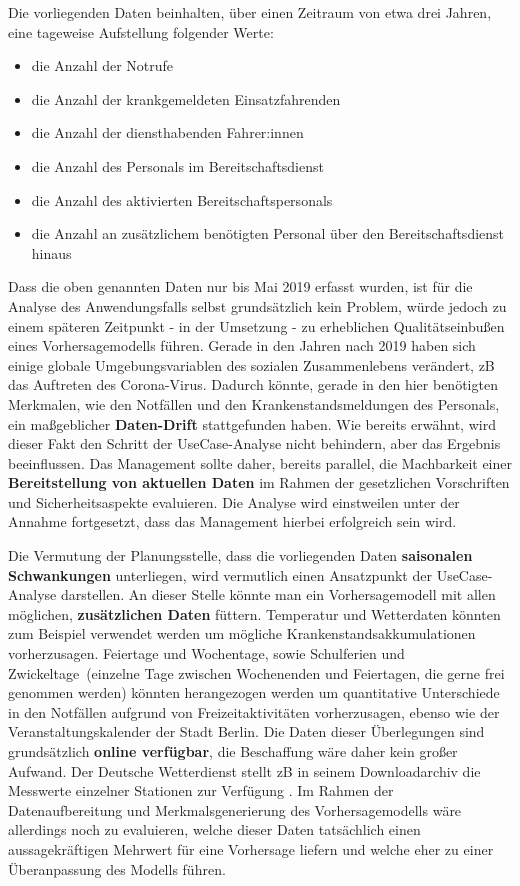 Die vorliegenden Daten beinhalten, über einen Zeitraum von etwa drei Jahren, eine tageweise Aufstellung folgender Werte:
 
\begin{itemize}
 \itemsep-8pt
 \item die Anzahl der Notrufe
 \item die Anzahl der krankgemeldeten Einsatzfahrenden
 \item die Anzahl der diensthabenden Fahrer:innen
 \item die Anzahl des Personals im Bereitschaftsdienst
 \item die Anzahl des aktivierten Bereitschaftspersonals
 \item die Anzahl an zusätzlichem benötigten Personal über den Bereitschaftsdienst hinaus
\end{itemize} 

Dass die oben genannten Daten nur bis Mai 2019 erfasst wurden, ist für die Analyse des Anwendungsfalls selbst grundsätzlich kein Problem, würde jedoch zu einem späteren Zeitpunkt - in der Umsetzung - zu erheblichen Qualitätseinbußen eines Vorhersagemodells führen. Gerade in den Jahren nach 2019 haben sich einige globale Umgebungsvariablen des sozialen Zusammenlebens verändert, zB das Auftreten des \glqq Corona-Virus\grqq . Dadurch könnte, gerade in den hier benötigten Merkmalen, wie den Notfällen und den Krankenstandsmeldungen des Personals, ein maßgeblicher \textbf{Daten-Drift} stattgefunden haben. Wie bereits erwähnt, wird dieser Fakt den Schritt der UseCase-Analyse nicht behindern, aber das Ergebnis beeinflussen. Das Management sollte daher, bereits parallel, die Machbarkeit einer \textbf{Bereitstellung von aktuellen Daten} im Rahmen der gesetzlichen Vorschriften und Sicherheitsaspekte evaluieren. Die Analyse wird einstweilen unter der Annahme fortgesetzt, dass das Management hierbei erfolgreich sein wird.

Die Vermutung der Planungsstelle, dass die vorliegenden Daten \textbf{saisonalen Schwankungen} unterliegen, wird vermutlich einen Ansatzpunkt der UseCase-Analyse darstellen. An dieser Stelle könnte man ein Vorhersagemodell mit allen möglichen, \textbf{zusätzlichen Daten} \glqq füttern\grqq . Temperatur und Wetterdaten könnten zum Beispiel verwendet werden um mögliche Krankenstandsakkumulationen vorherzusagen. Feiertage und Wochentage, sowie Schulferien und \glqq Zwickeltage\grqq\ (einzelne Tage zwischen Wochenenden und Feiertagen, die gerne frei genommen werden) könnten herangezogen werden um quantitative Unterschiede in den Notfällen aufgrund von Freizeitaktivitäten vorherzusagen, ebenso wie der Veranstaltungskalender der Stadt Berlin. Die Daten dieser Überlegungen sind grundsätzlich \textbf{online verfügbar}, die Beschaffung wäre daher kein großer Aufwand. Der Deutsche Wetterdienst stellt zB in seinem Downloadarchiv die Messwerte einzelner Stationen zur Verfügung \citep{dwd_wetter_2024}.  Im Rahmen der Datenaufbereitung und Merkmalsgenerierung des Vorhersagemodells wäre allerdings noch zu evaluieren, welche dieser Daten tatsächlich einen aussagekräftigen Mehrwert für eine Vorhersage liefern und welche eher zu einer Überanpassung des Modells führen.


